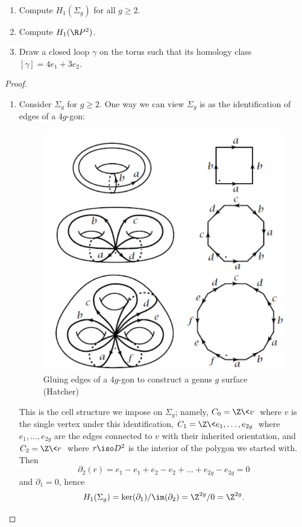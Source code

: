 \vspace{.5cm}
\begin{problem}$ $
	\begin{enumerate}
		\item Compute $H_1(\Sigma_g)$ for all $g \geq 2$.
		\item Compute $H_1(\R P^2)$.
		\item Draw a closed loop $\gamma$ on the torus such that its homology class $[\gamma] = 4e_1 + 3e_2$.
	\end{enumerate}
\end{problem}
\begin{proof}$ $
	\begin{enumerate}
		\item Consider $\Sigma_g$ for $g \geq 2$. One way we can view $\Sigma_g$ is as the identification of edges of a $4g$-gon:
		\begin{figure}[H]
			\centering
			\includegraphics[scale=.3]{figures/genus-g-construction}
			\caption{Gluing edges of a $4g$-gon to construct a genus $g$ surface (Hatcher)}
			\label{fig:genus-g-construction}
		\end{figure}
		This is the cell structure we impose on $\Sigma_g$; namely, $C_0 = \Z\<v\>$ where $v$ is the single vertex under this identification, $C_1 = \Z\<e_1,\dots,e_{2g}\>$ where $e_1,\dots,e_{2g}$ are the edges connected to $v$ with their inherited orientation, and $C_2 = \Z\<r\>$ where $r \iso D^2$ is the interior of the polygon we started with. Then \[\partial_2(r) = e_1 - e_1 + e_2 - e_2 + \dots + e_{2g} - e_{2g} = 0\] and $\partial_1 = 0$, hence \[H_1(\Sigma_g) = \ker(\partial_1)/\im(\partial_2) = \Z^{2g}/0 = \Z^{2g}.\]

\end{enumerate}
\end{proof}
